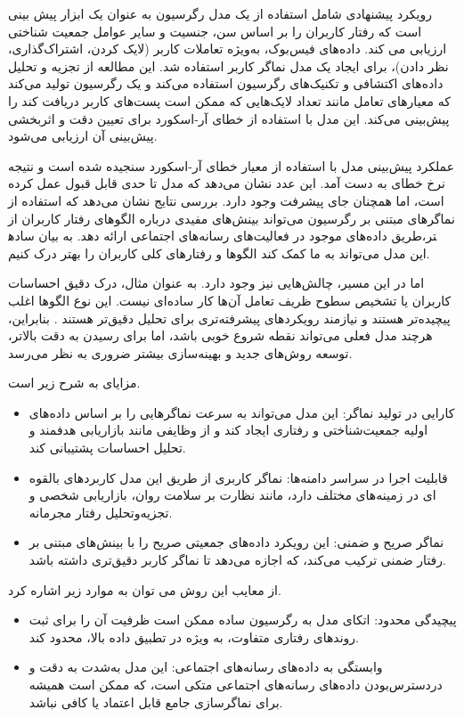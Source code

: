 رویکرد پیشنهادی شامل استفاده از یک مدل رگرسیون به عنوان یک ابزار پیش بینی است که رفتار کاربران را بر اساس سن، جنسیت و سایر عوامل جمعیت شناختی ارزیابی می کند. داده‌های فیس‌بوک، به‌ویژه تعاملات کاربر (لایک کردن، اشتراک‌گذاری، نظر دادن)، برای ایجاد یک مدل نماگر کاربر استفاده شد. این مطالعه از تجزیه و تحلیل داده‌های اکتشافی و تکنیک‌های رگرسیون استفاده می‌کند و یک رگرسیون تولید می‌کند که معیارهای تعامل مانند تعداد لایک‌هایی که ممکن است پست‌های کاربر دریافت کند را پیش‌بینی می‌کند. این مدل با استفاده از خطای 
آر-اسکورد%
برای تعیین دقت و اثربخشی پیش‌بینی آن ارزیابی می‌شود.
\newcommand{\RLnum}[1]{#1} %
\newcommand{\num}[1]{%
   \LR{\hspace{0pt}#1\hspace{0pt}}
}

عملکرد پیش‌بینی مدل با استفاده از معیار خطای آر-اسکورد سنجیده شده است و نتیجه نرخ خطای \num{۰.۱۹۹} به دست آمد. 
این عدد نشان می‌دهد که مدل تا حدی قابل قبول عمل کرده است، اما همچنان جای پیشرفت وجود دارد. بررسی نتایج نشان می‌دهد که استفاده از نماگر‌های مبتنی بر رگرسیون می‌تواند بینش‌های مفیدی درباره الگوهای رفتار کاربران از طریق داده‌های موجود در فعالیت‌های رسانه‌های اجتماعی ارائه دهد. به بیان ساده‎تر، این مدل می‌تواند به ما کمک کند الگوها و رفتارهای کلی کاربران را بهتر درک کنیم.

اما در این مسیر، چالش‌هایی نیز وجود دارد. به عنوان مثال، درک دقیق احساسات کاربران یا تشخیص سطوح ظریف تعامل آن‌ها کار ساده‌ای نیست. این نوع الگوها اغلب پیچیده‌تر هستند و نیازمند رویکردهای پیشرفته‌تری برای تحلیل دقیق‌تر هستند%
\cite{azzam2022model}
. بنابراین، هرچند مدل فعلی می‌تواند نقطه شروع خوبی باشد، اما برای رسیدن به دقت بالاتر، توسعه روش‌های جدید و بهینه‌سازی بیشتر ضروری به نظر می‌رسد.


مزایای %
\cite{azzam2022model}
 به شرح زیر است.
\begin{itemize}
\item
کارایی در تولید نماگر: این مدل می‌تواند به سرعت نماگر‌هایی را بر اساس داده‌های اولیه جمعیت‌شناختی و رفتاری ایجاد کند و از وظایفی مانند بازاریابی هدفمند و تحلیل احساسات پشتیبانی کند.
\item
قابلیت اجرا در سراسر دامنه‌ها: نماگر کاربری از طریق این مدل کاربردهای بالقوه ای در زمینه‌های مختلف دارد، مانند نظارت بر سلامت روان، بازاریابی شخصی و تجزیه‌وتحلیل رفتار مجرمانه.
\item
نماگر صریح و ضمنی: این رویکرد داده‌های جمعیتی صریح را با بینش‌های مبتنی بر رفتار ضمنی ترکیب می‌کند، که اجازه می‌دهد تا نماگر کاربر دقیق‌تری داشته باشد.
\end{itemize}
از معایب این روش می توان به موارد زیر اشاره کرد.
\begin{itemize}
\item
پیچیدگی محدود: اتکای مدل به رگرسیون ساده ممکن است ظرفیت آن را برای ثبت روندهای رفتاری متفاوت، به ویژه در تطبیق داده بالا، محدود کند.
\item
وابستگی به داده‌های رسانه‌های اجتماعی: این مدل به‌شدت به دقت و دردسترس‌بودن داده‌های رسانه‌های اجتماعی متکی است، که ممکن است همیشه برای نماگر‌سازی جامع قابل اعتماد یا کافی نباشد.
\end{itemize}


